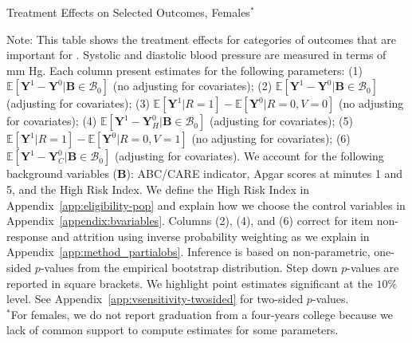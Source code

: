 \begin{table}
\centering
\begin{threeparttable}
\caption{Treatment Effects on Selected Outcomes, Females$^*$}\label{table:tescombinedfemales}
\begin{scriptsize}

\end{scriptsize}
\begin{tablenotes}
\scriptsize
Note: This table shows the treatment effects for categories of outcomes that are important for \citet{Garcia_Heckman_Leaf_etal_2017_Comp_CBA_Unpublished}. Systolic and diastolic blood pressure are measured in terms of mm Hg. Each column present estimates for the following parameters: (1) $\mathbb{E} \left [ \bm{Y}^1 -  \bm{Y}^0 | \bm{B} \in \mathcal{B}_{0} \right]$ (no adjusting for covariates); (2) $\mathbb{E} \left [ \bm{Y}^1 -  \bm{Y}^0 | \bm{B} \in \mathcal{B}_{0} \right]$ (adjusting for covariates); (3) $\mathbb{E} \left [ \bm{Y}^1 | R = 1 \right] -  \mathbb{E} \left [ \bm{Y}^0 | R = 0,V = 0  \right]$ (no adjusting for covariates); (4) $\mathbb{E} \left [ \bm{Y}^1 -  \bm{Y}_H^0 | \bm{B} \in \mathcal{B}_{0} \right]$ (adjusting for covariates); (5) $\mathbb{E} \left [ \bm{Y}^1 | R = 1 \right] -  \mathbb{E} \left [ \bm{Y}^0 | R = 0,V = 1 \right]$ (no adjusting for covariates); (6) $\mathbb{E} \left [ \bm{Y}^1 -  \bm{Y}_C^0 | \bm{B} \in \mathcal{B}_{0} \right]$ (adjusting for covariates). We account for the following background variables ($\bm{B}$): ABC/CARE indicator, Apgar scores at minutes 1 and 5, and the High Risk Index. We define the High Risk Index in Appendix~\ref{app:eligibility-pop} and explain how we choose the control variables in Appendix~\ref{appendix:bvariables}. Columns (2), (4), and (6) correct for item non-response and attrition using inverse probability weighting as we explain in Appendix~\ref{app:method_partialobs}. Inference is based on non-parametric, one-sided $p$-values from the empirical bootstrap distribution. Step down $p$-values are reported in square brackets. We highlight point estimates significant at the $10\%$ level. See Appendix~\ref{app:vsensitivity-twosided} for two-sided $p$-values.\\
$^*$For females, we do not report graduation from a four-years college because we lack of common support to compute estimates for some parameters.
\end{tablenotes}
\end{threeparttable}
\end{table}
\doublespacing

